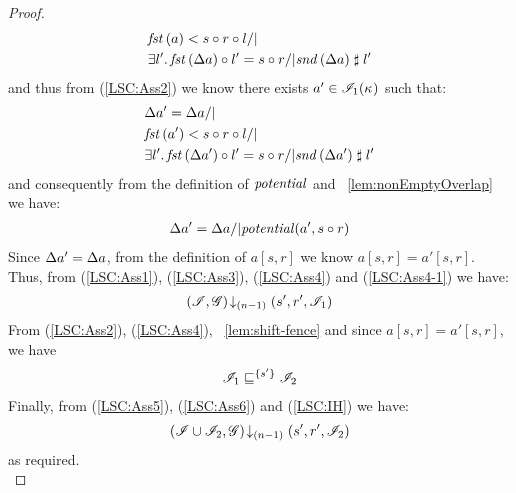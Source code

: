 \begin{lemma}
\begin{proof}
%
\begin{align*}
	& \fst{a} < s \composeL r \composeL l /| \null\\
	& \exsts{l'} \fst{\updateFP{a}} \composeL l' = s \composeL r /| \snd{\updateFP{a}} \compatible l'
\end{align*}
%
and thus from (\ref{LSC:Ass2}) we know there exists $a' \in \mathscr{I}_1(\kappa_{})$ such that: 
%
\begin{align*}
	& \updateFP{a'} = \updateFP{a} /|\\
	& \fst{a'} < s \composeL r \composeL l /| \null\\
	& \exsts{l'} \fst{\updateFP{a'}} \composeL l' = s \composeL r /| \snd{\updateFP{a'}} \compatible l'
\end{align*}
%
and consequently from the definition of $\mathit{potential}$ and \lem~\ref{lem:nonEmptyOverlap} we have: 
%
\begin{align}
	\Delta {a'} = \Delta {a} /| \mathit{potential}(a', s \circ r) \label{LSC:Ass4-1}
\end{align}
Since $\Delta {a'} = \Delta {a}$, from the definition of $a[s, r]$ we know $a[s, r] = a'[s, r]$. Thus, from (\ref{LSC:Ass1}), (\ref{LSC:Ass3}), (\ref{LSC:Ass4}) and (\ref{LSC:Ass4-1}) we have:
%
\begin{align}
	\left(\mathscr{I}, \mathscr{G}\right) \!\downarrow_{(n-1)} \left(s', r', \mathscr{I}_1\right) \label{LSC:Ass5}
\end{align}
%
From (\ref{LSC:Ass2}), (\ref{LSC:Ass4}), \lem~\ref{lem:shift-fence} and since $a[s, r] = a'[s, r]$, we have
%
\begin{align}
	\mathscr{I}_1 \sqsubseteq^{\{s'\}} \mathscr{I}_2 \label{LSC:Ass6}
\end{align}
%
Finally, from (\ref{LSC:Ass5}), (\ref{LSC:Ass6}) and (\ref{LSC:IH}) we have:
%
\begin{align*}
	\left(\mathscr{I} \cup \mathscr{I}_2, \mathscr{G}\right) \!\downarrow_{(n-1)} \left(s', r', \mathscr{I}_2\right)
\end{align*}
%
as required.\\
%
%
%
%


\end{proof}
\end{lemma}
